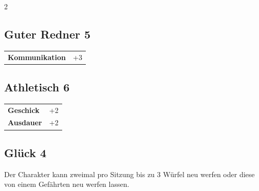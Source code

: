 \begin{multicols}{2}
\begin{tcolorbox}
    \subsection*{Guter Redner \hfill \small{5 }}
    \tcblower




\begin{tabular}{@{}ll@{}}
    \textbf{Kommunikation} & +3\\
\end{tabular}


\end{tcolorbox}

\begin{tcolorbox}
    \subsection*{Athletisch \hfill \small{6 }}
    \tcblower




\begin{tabular}{@{}ll@{}}
    \textbf{Geschick} & +2\\
    \textbf{Ausdauer} & +2\\
\end{tabular}


\end{tcolorbox}

\begin{tcolorbox}
    \subsection*{Glück \hfill \small{4 }}
    \tcblower
Der Charakter kann zweimal pro Sitzung bis zu 3 Würfel neu werfen oder diese von einem Gefährten neu werfen lassen.


\vspace{3mm}




\end{tcolorbox}
\end{multicols}
